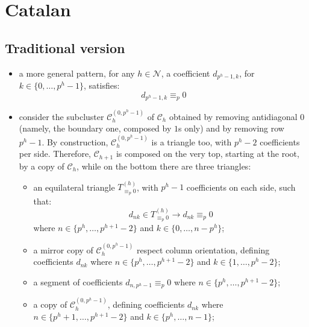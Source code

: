 \documentclass[11pt,a4paper]{article} %
\begin{document}
    \section{Catalan}

    \subsection{Traditional version}

    \begin{itemize}
        \item a more general pattern, for any $h\in\mathcal{N}$, 
            a coefficient $d_{p^{h}-1,k}$, for $k\in\lbrace0,\ldots,p^{h}-1 \rbrace$, 
            satisfies:
            \begin{displaymath}
                d_{p^{h}-1,k} \equiv_{p} 0
            \end{displaymath}
        \item consider the subcluster $\mathcal{C}_{h}^{(0,p^{h}-1)}$ of 
            $\mathcal{C}_{h}$ obtained by removing antidiagonal $0$ (namely,
            the boundary one, composed by $1$s only) and by removing row $p^{h}-1$.
            By construction, $\mathcal{C}_{h}^{(0,p^{h}-1)}$ is a triangle too, 
            with $p^{h}-2$ coefficients per side. Therefore, $\mathcal{C}_{h+1}$
            is composed on the very top, starting at the root, by a copy of $\mathcal{C}_{h}$,
            while on the bottom there are three triangles:
            \begin{itemize}                
                \item an equilateral triangle $T_{\equiv_{p} 0}^{(h)}$, 
                    with $p^{h}-1$ coefficients on each side, such that:
                    \begin{displaymath}
                        d_{nk} \in T_{\equiv_{p} 0}^{(h)} \rightarrow d_{nk} \equiv_{p} 0
                    \end{displaymath}
                    where $n\in\lbrace p^{h},\ldots,p^{h+1}-2\rbrace$ and 
                    $k\in\lbrace 0,\ldots, n-p^{h}\rbrace$;
                \item a mirror copy of $\mathcal{C}_{h}^{(0,p^{h}-1)}$ respect column orientation,
                    defining coefficients $d_{nk}$  
                    where $n\in\lbrace p^{h},\ldots,p^{h+1}-2\rbrace$ and 
                    $k\in\lbrace 1,\ldots, p^{h}-2\rbrace$;
                \item a segment of coefficients $d_{n, p^{h}-1} \equiv_{p} 0$ 
                    where $n\in\lbrace p^{h},\ldots,p^{h+1}-2\rbrace$;
                \item a copy of $\mathcal{C}_{h}^{(0,p^{h}-1)}$,
                    defining coefficients $d_{nk}$  
                    where $n\in\lbrace p^{h}+1,\ldots,p^{h+1}-2\rbrace$ and 
                    $k\in\lbrace p^{h},\ldots, n-1\rbrace$;
            \end{itemize}                
    \end{itemize}
\end{document}
